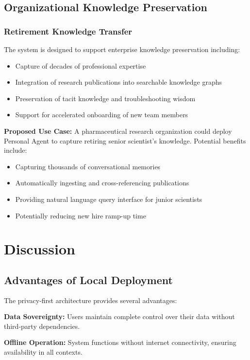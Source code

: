 \documentclass[11pt,letterpaper]{article}
\begin{document}
\subsection{Organizational Knowledge Preservation}

\subsubsection{Retirement Knowledge Transfer}

The system is designed to support enterprise knowledge preservation including:
\begin{itemize}
\item Capture of decades of professional expertise
\item Integration of research publications into searchable knowledge graphs
\item Preservation of tacit knowledge and troubleshooting wisdom
\item Support for accelerated onboarding of new team members
\end{itemize}

\textbf{Proposed Use Case:} A pharmaceutical research organization could deploy Personal Agent to capture retiring senior scientist's knowledge. Potential benefits include:
\begin{itemize}
\item Capturing thousands of conversational memories
\item Automatically ingesting and cross-referencing publications
\item Providing natural language query interface for junior scientists
\item Potentially reducing new hire ramp-up time
\end{itemize}

\section{Discussion}

\subsection{Advantages of Local Deployment}

The privacy-first architecture provides several advantages:

\textbf{Data Sovereignty:} Users maintain complete control over their data without third-party dependencies.

\textbf{Offline Operation:} System functions without internet connectivity, ensuring availability in all contexts.
\end{document}
